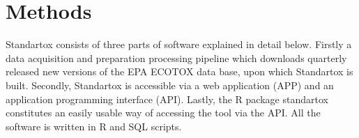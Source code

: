 \section*{Methods}

Standartox consists of three parts of software explained in detail below. Firstly a data acquisition and preparation processing pipeline which downloads quarterly released new versions of the EPA ECOTOX data base, upon which Standartox is built. Secondly, Standartox is accessible via a web application (APP) and an application programming interface (API). Lastly, the R package standartox constitutes an easily usable way of accessing the tool via the API. All the software is written in R \citep{rcoreteam_language_2017} and SQL scripts.

